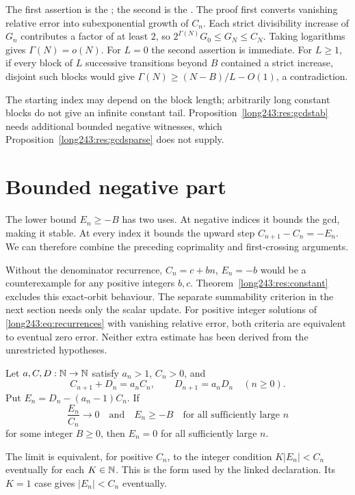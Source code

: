 \documentclass[11pt]{article}
\begin{document}
\noindent The first assertion is the
; the second is the
. The proof first converts vanishing relative
error into subexponential growth of $C_n$. Each strict divisibility increase
of $G_n$ contributes a factor of at least $2$, so
$2^{\Gamma(N)}G_0\le G_N\le C_N$. Taking logarithms gives
$\Gamma(N)=o(N)$. For $L=0$ the second assertion is immediate.
For $L\ge1$, if every block of $L$ successive transitions beyond $B$
contained a strict increase, disjoint such blocks would give
$\Gamma(N)\ge(N-B)/L-O(1)$, a contradiction.

The starting index may depend on the block length; arbitrarily long
constant blocks do not give an infinite constant tail.
Proposition~\ref{long243:res:gcdstab} needs additional bounded negative
witnesses, which Proposition~\ref{long243:res:gcdsparse} does not supply.

\section{Bounded negative part}\label{long243:sec:bounded}

The lower bound $E_n\ge-B$ has two uses. At negative indices it
bounds the gcd, making it stable. At every index it bounds the upward
step $C_{n+1}-C_n=-E_n$. We can therefore combine the preceding
coprimality and first-crossing arguments.

Without the denominator recurrence, $C_n=c+bn$, $E_n=-b$ would be
a counterexample for any positive integers $b,c$.
Theorem~\ref{long243:res:constant} excludes this exact-orbit behaviour.
The separate summability criterion in the next section needs only the
scalar update. For positive integer solutions of \eqref{long243:eq:recurrences} with vanishing relative error,
both criteria are equivalent to eventual zero error. Neither extra
estimate has been derived from the unrestricted hypotheses.

\begin{theorem}\label{long243:res:bounded}
Let $a,C,D:\mathbb{N}\to\mathbb{N}$ satisfy $a_n>1$, $C_n>0$, and
\[
 C_{n+1}+D_n=a_nC_n,\qquad D_{n+1}=a_nD_n
 \quad(n\ge0).
\]
Put $E_n=D_n-(a_n-1)C_n$. If
\[
 \frac{E_n}{C_n}\longrightarrow0
 \quad\text{and}\quad E_n\ge-B\quad\text{for all sufficiently large }n
\]
for some integer $B\ge0$, then $E_n=0$ for all sufficiently large $n$.
\end{theorem}
The limit is equivalent, for positive $C_n$, to the integer condition
$K|E_n|<C_n$ eventually for each $K\in\mathbb{N}$. This is the form used
by the linked declaration. Its $K=1$ case gives $|E_n|<C_n$ eventually.
\end{document}
